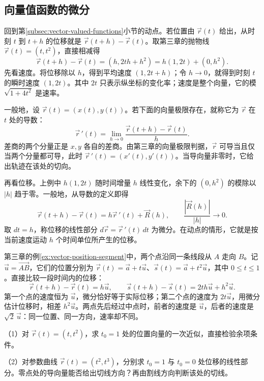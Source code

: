 \endgroup
\FloatBarrier
\newpage
\subsection{向量值函数的微分}\label{subsec:calculus-vector-differential}

回到第\ref{subsec:vector-valued-functions}小节的动点。若位置由 \(\vec r(t)\) 给出，从时刻 \(t\) 到 \(t+h\) 的位移就是 \(\vec r(t+h)-\vec r(t)\)。取第三章的抛物线 \(\vec r(t)=(t,t^2)\)，直接相减得
\[
 \vec r(t+h)-\vec r(t)=(h,2th+h^2)=h(1,2t)+(0,h^2).
\]
先看速度。将位移除以 \(h\)，得到平均速度 \((1,2t+h)\)；令 \(h\to0\)，就得到时刻 \(t\) 的瞬时速度 \((1,2t)\)。其中 \(2t\) 只表示纵坐标的变化率；速度是整个向量，它的模 \(\sqrt{1+4t^2}\) 是速率。

一般地，设 \(\vec r(t)=(x(t),y(t))\)。若下面的向量极限存在，就称它为 \(\vec r\) 在 \(t\) 处的{\heiti{}导数}：
\[
 \vec r\,'(t)=\lim_{h\to0}\frac{\vec r(t+h)-\vec r(t)}h.
\]
差商的两个分量正是 \(x,y\) 各自的差商。由第三章的向量极限判据，\(\vec r\) 可导当且仅当两个分量都可导，此时 \(\vec r\,'(t)=(x'(t),y'(t))\)。当导向量非零时，它给出轨迹在该处的切向。

再看位移。上例中 \(h(1,2t)\) 随时间增量 \(h\) 线性变化，余下的 \((0,h^2)\) 的模除以 \(|h|\) 趋于零。一般地，从导数的定义即得
\[
 \vec r(t+h)-\vec r(t)=h\vec r\,'(t)+\vec R(h),\qquad
 \frac{|\vec R(h)|}{|h|}\longrightarrow0.
\]
取 \(dt=h\)，称位移的线性部分 \(d\vec r=\vec r\,'(t)\,dt\) 为{\heiti{}微分}。在动点的情形，它就是按当前速度运动 \(h\) 个时间单位所产生的位移。

第三章的例\ref{ex:vector-position-segment}中，两个点沿同一条线段从 \(A\) 走向 \(B\)。记 \(\vec u=\overrightarrow{AB}\)，它们的位置分别为 \(\vec r(t)=\vec a+t\vec u\)、\(\vec s(t)=\vec a+t^2\vec u\)，其中 \(0\leq t\leq1\)。直接比较一段时间内的位移：
\[
 \vec r(t+h)-\vec r(t)=h\vec u,\qquad
 \vec s(t+h)-\vec s(t)=2th\vec u+h^2\vec u.
\]
第一个点的速度恒为 \(\vec u\)，微分恰好等于实际位移；第二个点的速度为 \(2t\vec u\)，用微分估计位移时，相差 \(h^2\vec u\)。两点先后经过中点时，前者的速度是 \(\vec u\)，后者的速度是 \(\sqrt2\,\vec u\)：同一位置、同一方向，速率却不同。

\begin{exercise}
\mbox{}\par\nobreak

（1）对 \(\vec r(t)=(t,t^2)\)，求 \(t_0=1\) 处的位置向量的一次近似，直接检验余项条件。

（2）对参数曲线 \(\vec r(t)=(t^2,t^3)\)，分别求 \(t_0=1\) 与 \(t_0=0\) 处位移的线性部分。零点处的导向量能否给出切线方向？再由割线方向判断该处的切线。
\end{exercise}

